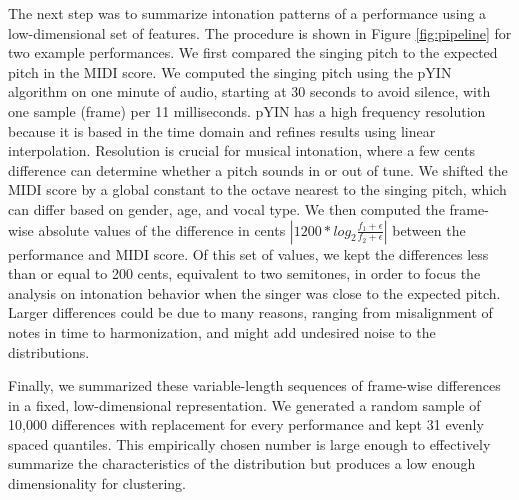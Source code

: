 The next step was to summarize intonation patterns of a performance using a low-dimensional set of features. The procedure is shown in Figure \ref{fig:pipeline} for two example performances. We first compared the singing pitch to the expected pitch in the MIDI score. We computed the singing pitch using the pYIN algorithm \cite{mauch2014pyin} on one minute of audio, starting at 30 seconds to avoid silence, with one sample (frame) per 11 milliseconds. pYIN has a high frequency resolution because it is based in the time domain and refines results using linear interpolation. Resolution is crucial for musical intonation, where a few cents difference can determine whether a pitch sounds in or out of tune. We shifted the MIDI score by a global constant to the octave nearest to the singing pitch, which can differ based on gender, age, and vocal type. We then computed the frame-wise absolute values of the difference in cents $\left| 1200 * log_2 \frac{f_1 + \epsilon} {f_2 + \epsilon} \right|$ between the performance and MIDI score. Of this set of values, we kept the differences less than or equal to 200 cents, equivalent to two semitones, in order to focus the analysis on intonation behavior when the singer was close to the expected pitch. Larger differences could be due to many reasons, ranging from misalignment of notes in time to harmonization, and might add undesired noise to the distributions. 

Finally, we summarized these variable-length sequences of frame-wise differences in a fixed, low-dimensional representation. We generated a random sample of 10,000 differences with replacement for every performance and kept 31 evenly spaced quantiles. This empirically chosen number is large enough to effectively summarize the characteristics of the distribution but produces a low enough dimensionality for clustering.

